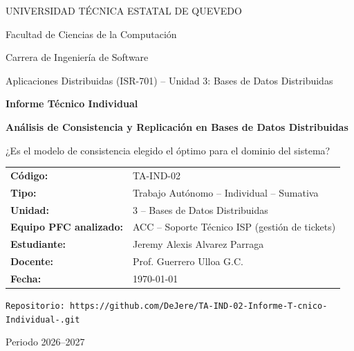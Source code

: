 \documentclass[11pt,a4paper]{article}
\title{}
\date{}
\begin{document}
\sloppy

\begin{titlepage}
\centering
\vspace*{1cm}
{\large UNIVERSIDAD T\'ECNICA ESTATAL DE QUEVEDO\par}
{\normalsize Facultad de Ciencias de la Computaci\'on\par}
{\normalsize Carrera de Ingenier\'ia de Software\par}
\vspace{0.3cm}
{\normalsize Aplicaciones Distribuidas (ISR-701) -- Unidad 3: Bases de Datos Distribuidas\par}

\vspace{2.5cm}
{\Large \bfseries Informe T\'ecnico Individual\par}
\vspace{0.4cm}
{\Large \bfseries An\'alisis de Consistencia y Replicaci\'on en Bases de Datos Distribuidas\par}
\vspace{0.6cm}
{\large ¿Es el modelo de consistencia elegido el \'optimo para el dominio del sistema?\par}

\vspace{2.2cm}
\begin{tabular}{ll}
\textbf{C\'odigo:} & TA-IND-02 \\[0.3em]
\textbf{Tipo:} & Trabajo Aut\'onomo -- Individual -- Sumativa \\[0.3em]
\textbf{Unidad:} & 3 -- Bases de Datos Distribuidas \\[0.3em]
\textbf{Equipo PFC analizado:} & ACC -- Soporte T\'ecnico ISP (gesti\'on de tickets) \\[0.3em]
\textbf{Estudiante:} & Jeremy Alexis Alvarez Parraga \\[0.3em]
\textbf{Docente:} & Prof. Guerrero Ulloa G.C. \\[0.3em]
\textbf{Fecha:} & \today \\
\end{tabular}

\vspace{1.2cm}
{\small\texttt{Repositorio: https://github.com/DeJere/TA-IND-02-Informe-T-cnico-Individual-.git}\par}

\vfill
{\normalsize Periodo 2026--2027\par}
\end{titlepage}
\end{document}
